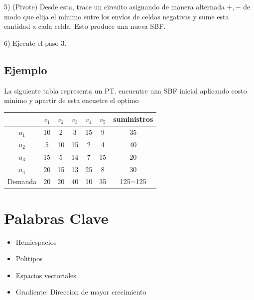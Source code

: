 \documentclass{article}
\begin{document}
5) (Pivote) Desde esta, trace un circuito asignando de manera alternada \(+ , -\) de modo que elija el mínimo entre los envíos de celdas negativas y sume esta cantidad a cada celda. Esto produce una nueva SBF.

6) Ejecute el paso 3.

\subsection*{Ejemplo}

La siguiente tabla representa un PT. encuentre una SBF inicial aplicando costo minimo y apartir de esta encuetre el optimo

\begin{tabular}{c|c|c|c|c|c|c}
            & $v_1$ & $v_2$ & $v_3$ & $v_4$ & $v_5$ & suministros \\ \hline
    $u_1$   & 10    & 2     & 3     & 15    & 9     & 35          \\ \hline
    $u_2$   & 5     & 10    & 15    & 2     & 4     & 40          \\ \hline
    $u_3$   & 15    & 5     & 14    & 7     & 15    & 20          \\ \hline
    $u_4$   & 20    & 15    & 13    & 25    & 8     & 30          \\ \hline
    Demanda & 20    & 20    & 40    & 10    & 35    & 125=125     \\
\end{tabular}


\section*{Palabras Clave}

\begin{itemize}
    \item Hemiespacios
    \item Politipos
    \item Espacios vectoriales
    \item Gradiente: Direccion de mayor crecimiento
\end{itemize}
\end{document}

